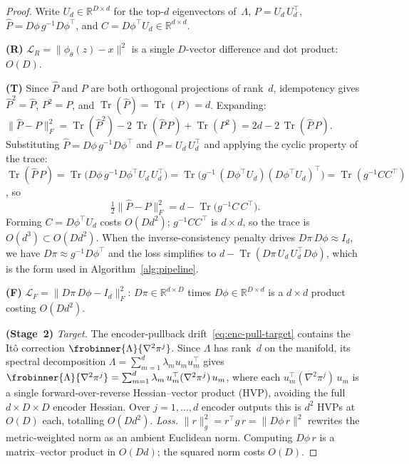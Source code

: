\documentclass[11pt]{article}
\newcommand{\R}{\mathbb{R}}
\newcommand{\cL}{\mathcal{L}}
\newcommand{\tr}{\operatorname{Tr}}
\newcommand{\norm}[1]{\lVert#1\rVert}
\begin{document}
\begin{proof}
  Write $U_d\in\R^{D\times d}$ for the top-$d$ eigenvectors
  of~$\Lambda$, $P=U_d\,U_d^\top$, $\hat P=D\phi\,g^{-1}D\phi^\top$,
  and $C=D\phi^\top U_d\in\R^{d\times d}$.

\smallskip
  \textbf{(R)}
  $\cL_R = \norm{\phi_\theta(z)-x}^2$ is a single $D$-vector
  difference and dot product: $O(D)$.

\smallskip
  \textbf{(T)}
  Since $\hat P$ and $P$ are both orthogonal projections of
  rank~$d$, idempotency gives $\hat P^2=\hat P$, $P^2=P$, and
  $\tr(\hat P)=\tr(P)=d$.
  Expanding:
  $\norm{\hat P-P}_F^2
  = \tr(\hat P^2) - 2\,\tr(\hat P\,P) + \tr(P^2)
  = 2d - 2\,\tr(\hat P\,P)$.
  Substituting $\hat P=D\phi\,g^{-1}D\phi^\top$ and
  $P=U_d\,U_d^\top$ and applying the cyclic property of the trace:
  $\tr(\hat P\,P)
  = \tr\bigl(D\phi\,g^{-1}D\phi^\top U_d\,U_d^\top\bigr)
  = \tr\bigl(g^{-1}\,(D\phi^\top U_d)(D\phi^\top U_d)^\top\bigr)
  = \tr(g^{-1}CC^\top)$,
  so
  \begin{equation}\label{eq:tangent-trace}
    \tfrac{1}{2}\norm{\hat P-P}_F^2
    = d - \tr\bigl(g^{-1}C\,C^\top\bigr).
  \end{equation}
  Forming $C=D\phi^\top U_d$ costs $O(Dd^2)$;
  $g^{-1}CC^\top$ is $d\times d$,
  so the trace is $O(d^3)\subset O(Dd^2)$.
  When the inverse-consistency penalty drives
  $D\pi\,D\phi\approx I_d$, we have
  $D\pi\approx g^{-1}D\phi^\top$ and the loss
  simplifies to $d - \tr(D\pi\,U_d\,U_d^\top D\phi)$,
  which is the form used in Algorithm~\ref{alg:pipeline}.

\smallskip
  \textbf{(F)}
  $\cL_F = \norm{D\pi\,D\phi - I_d}_F^2$:
  $D\pi\in\R^{d\times D}$ times $D\phi\in\R^{D\times d}$
  is a $d\times d$ product costing $O(Dd^2)$.

\smallskip
  \textbf{(Stage~2)}
  \emph{Target.}
  The encoder-pullback drift~\eqref{eq:enc-pull-target} contains
  the Itô correction $\frobinner{\Lambda}{\nabla^2\pi^j}$.
  Since $\Lambda$ has rank~$d$ on the manifold,
  its spectral decomposition
  $\Lambda = \sum_{m=1}^d \lambda_m u_m u_m^\top$ gives
  $\frobinner{\Lambda}{\nabla^2\pi^j}
  = \sum_{m=1}^d \lambda_m\,u_m^\top(\nabla^2\pi^j)\,u_m$,
  where each $u_m^\top(\nabla^2\pi^j)\,u_m$ is a single
  forward-over-reverse Hessian--vector product (HVP), avoiding
  the full $d\times D\times D$ encoder Hessian.
  Over $j=1,\dots,d$ encoder outputs this is $d^2$ HVPs at $O(D)$
  each, totalling $O(Dd^2)$.
  \emph{Loss.}
  $\norm{r}_g^2 = r^\top g\,r = \norm{D\phi\,r}^2$
  rewrites the metric-weighted norm as an ambient Euclidean norm.
  Computing $D\phi\,r$ is a matrix--vector product in $O(Dd)$;
  the squared norm costs $O(D)$.


\end{proof}
\end{document}
